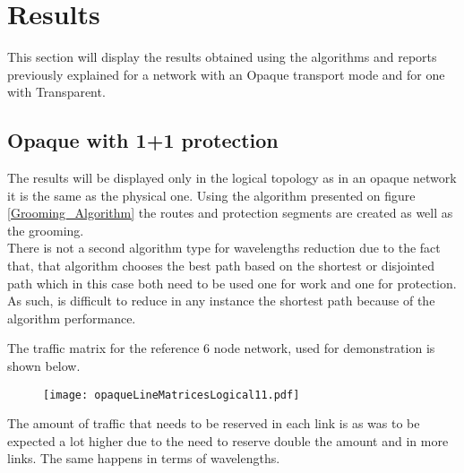 	\section{Results}
	This section will display the results obtained using the algorithms and reports previously explained for a network with an Opaque transport mode and for one with Transparent.

	
	\subsection{Opaque with 1+1 protection}
	
	The results will be displayed only in the logical topology as in an opaque network it is the same as the physical one.
	Using the algorithm presented on figure \ref{Grooming_Algorithm} the routes and protection segments are created as well as the grooming. \\
	
	There is not a second algorithm type for wavelengths reduction due to the fact that, that algorithm chooses the best path based on the shortest or disjointed path which in this case both need to be used one for work and one for protection. As such, is difficult to reduce in any instance the shortest path because of the algorithm performance.
	
	The traffic matrix for the reference 6 node network, used for demonstration is shown below.
	
	\begin{figure}[h!]
		\centering
		\texttt{[image: opaqueLineMatricesLogical11.pdf]}	
		\caption{}
		\label{opaqueLineMatricesLogical11}								
	\end{figure}	
	
	The amount of traffic that needs to be reserved in each link is as was to be expected a lot higher due to the need to reserve double the amount and in more links. The same happens in terms of wavelengths. \\
	
%	
%	
	
